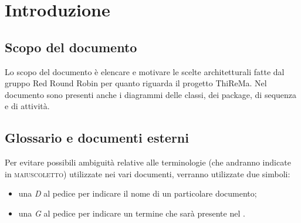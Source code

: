 \section{Introduzione}
	\subsection{Scopo del documento}
		Lo scopo del documento è elencare e motivare le scelte architetturali fatte dal gruppo Red Round Robin per quanto riguarda il progetto ThiReMa. Nel documento sono presenti anche i diagrammi delle classi, dei package, di sequenza e di attività.
	\subsection{Glossario e documenti esterni}
		Per evitare possibili ambiguità relative alle terminologie (che andranno indicate in \textsc{maiuscoletto}) utilizzate nei vari documenti, verranno utilizzate due simboli:
		\begin{itemize}
			\item una \textit{D} al pedice per indicare il nome di un particolare documento;
			\item una \textit{G} al pedice per indicare un termine che sarà presente nel .
		\end{itemize}
	